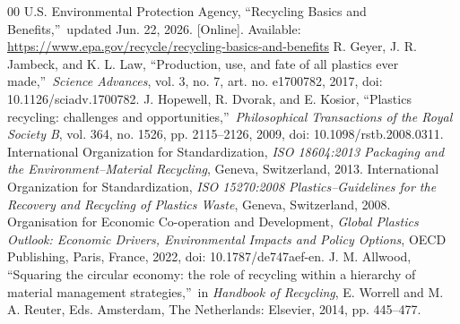 \documentclass[conference]{IEEEtran}
\begin{document}
\begin{thebibliography}{00}
 U.S. Environmental Protection Agency, \textquotedblleft Recycling Basics and Benefits,\textquotedblright\ updated Jun. 22, 2026. [Online]. Available: \url{https://www.epa.gov/recycle/recycling-basics-and-benefits}
 R. Geyer, J. R. Jambeck, and K. L. Law, \textquotedblleft Production, use, and fate of all plastics ever made,\textquotedblright\ \textit{Science Advances}, vol. 3, no. 7, art. no. e1700782, 2017, doi: 10.1126/sciadv.1700782.
 J. Hopewell, R. Dvorak, and E. Kosior, \textquotedblleft Plastics recycling: challenges and opportunities,\textquotedblright\ \textit{Philosophical Transactions of the Royal Society B}, vol. 364, no. 1526, pp. 2115--2126, 2009, doi: 10.1098/rstb.2008.0311.
 International Organization for Standardization, \textit{ISO 18604:2013 Packaging and the Environment--Material Recycling}, Geneva, Switzerland, 2013.
 International Organization for Standardization, \textit{ISO 15270:2008 Plastics--Guidelines for the Recovery and Recycling of Plastics Waste}, Geneva, Switzerland, 2008.
 Organisation for Economic Co-operation and Development, \textit{Global Plastics Outlook: Economic Drivers, Environmental Impacts and Policy Options}, OECD Publishing, Paris, France, 2022, doi: 10.1787/de747aef-en.
 J. M. Allwood, \textquotedblleft Squaring the circular economy: the role of recycling within a hierarchy of material management strategies,\textquotedblright\ in \textit{Handbook of Recycling}, E. Worrell and M. A. Reuter, Eds. Amsterdam, The Netherlands: Elsevier, 2014, pp. 445--477.
\end{thebibliography}
\end{document}
